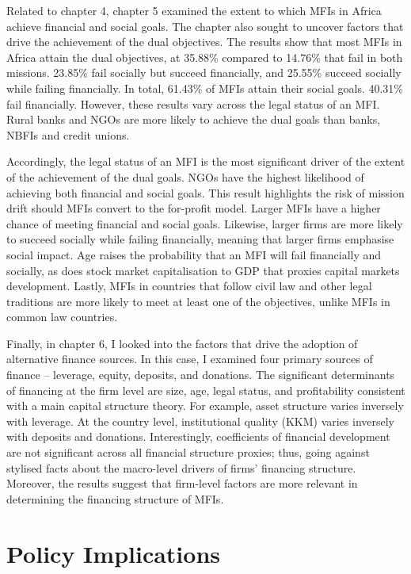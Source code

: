 \documentclass[a4paper, nobind]{templates/ociamthesis}
\begin{document}
Related to chapter 4, chapter 5 examined the extent to which MFIs in Africa achieve financial and social goals. The chapter also sought to uncover factors that drive the achievement of the dual objectives. The results show that most MFIs in Africa attain the dual objectives, at 35.88\% compared to 14.76\% that fail in both missions. 23.85\% fail socially but succeed financially, and 25.55\% succeed socially while failing financially. In total, 61.43\% of MFIs attain their social goals. 40.31\% fail financially. However, these results vary across the legal status of an MFI. Rural banks and NGOs are more likely to achieve the dual goals than banks, NBFIs and credit unions.

Accordingly, the legal status of an MFI is the most significant driver of the extent of the achievement of the dual goals. NGOs have the highest likelihood of achieving both financial and social goals. This result highlights the risk of mission drift should MFIs convert to the for-profit model. Larger MFIs have a higher chance of meeting financial and social goals. Likewise, larger firms are more likely to succeed socially while failing financially, meaning that larger firms emphasise social impact. Age raises the probability that an MFI will fail financially and socially, as does stock market capitalisation to GDP that proxies capital markets development. Lastly, MFIs in countries that follow civil law and other legal traditions are more likely to meet at least one of the objectives, unlike MFIs in common law countries.

Finally, in chapter 6, I looked into the factors that drive the adoption of alternative finance sources. In this case, I examined four primary sources of finance -- leverage, equity, deposits, and donations. The significant determinants of financing at the firm level are size, age, legal status, and profitability consistent with a main capital structure theory. For example, asset structure varies inversely with leverage. At the country level, institutional quality (KKM) varies inversely with deposits and donations. Interestingly, coefficients of financial development are not significant across all financial structure proxies; thus, going against stylised facts about the macro-level drivers of firms' financing structure. Moreover, the results suggest that firm-level factors are more relevant in determining the financing structure of MFIs.

\hypertarget{policy-implications}{%
\section{Policy Implications}\label{policy-implications}}
\end{document}
